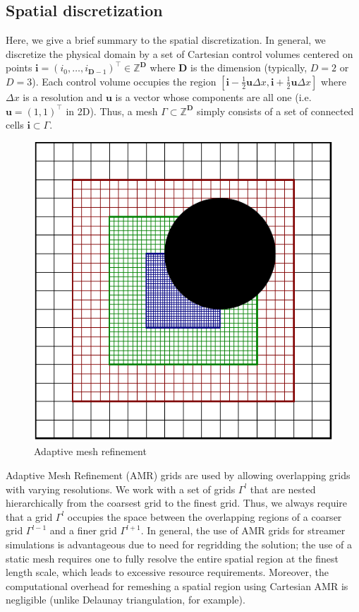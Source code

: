 \documentclass[3p]{elsarticle}
\begin{document}
\subsection{Spatial discretization}
Here, we give a brief summary to the spatial discretization. In general, we discretize the physical domain by a set of Cartesian control volumes centered on points $\bm{i} = (i_0, \ldots, i_{\bm{D}-1})^\intercal \in \mathbb{Z}^{\bm{D}}$ where $\bm{D}$ is the dimension (typically, $D = 2$ or $D = 3$). Each control volume occupies the region $[\bm{i} - \frac{1}{2}\bm{u}\Delta x, \bm{i} + \frac{1}{2}\bm{u}\Delta x]$ where $\Delta x$ is a resolution and $\bm{u}$ is a vector whose components are all one (i.e. $\bm{u} = (1,1)^\intercal$ in 2D). Thus, a mesh $\Gamma\subset \mathbb{Z}^{\bm{D}}$ simply consists of a set of connected cells $\bm{i} \subset \Gamma$. 



\begin{figure}[ht]
    \centering
    \includegraphics{./figures/amr}
    \caption{Adaptive mesh refinement}
    \label{fig:amr}
\end{figure}

Adaptive Mesh Refinement (AMR) grids are used by allowing overlapping grids with varying resolutions. We work with a set of grids $\Gamma^l$ that are nested hierarchically from the coarsest grid to the finest grid. Thus, we always require that a grid $\Gamma^l$ occupies the space between the overlapping regions of a coarser grid $\Gamma^{l-1}$ and a finer grid $\Gamma^{l+1}$. In general, the use of AMR grids for streamer simulations is advantageous due to need for regridding the solution; the use of a static mesh requires one to fully resolve the entire spatial region at the finest length scale, which leads to excessive resource requirements. Moreover, the computational overhead for remeshing a spatial region using Cartesian AMR is negligible (unlike Delaunay triangulation, for example). 
\end{document}
